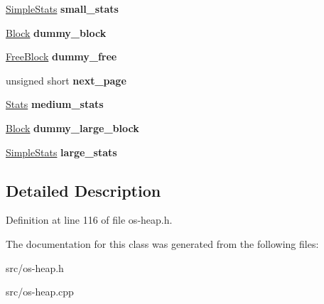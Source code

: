 \begin{DoxyCompactItemize}
\item 
\hyperlink{class_object_script_1_1_o_s_heap_manager_1_1_simple_stats}{Simple\+Stats} {\bfseries small\+\_\+stats}\hypertarget{class_object_script_1_1_o_s_heap_manager_aa19cb6cabaf7e63bc7eb643a29bc249e}{}\label{class_object_script_1_1_o_s_heap_manager_aa19cb6cabaf7e63bc7eb643a29bc249e}

\item 
\hyperlink{struct_object_script_1_1_o_s_heap_manager_1_1_block}{Block} {\bfseries dummy\+\_\+block}\hypertarget{class_object_script_1_1_o_s_heap_manager_a700aac3b5f7873b17e9ebff734cb378a}{}\label{class_object_script_1_1_o_s_heap_manager_a700aac3b5f7873b17e9ebff734cb378a}

\item 
\hyperlink{struct_object_script_1_1_o_s_heap_manager_1_1_free_block}{Free\+Block} {\bfseries dummy\+\_\+free}\hypertarget{class_object_script_1_1_o_s_heap_manager_a4fe7cf164b2a6abb4bf6d7792993449b}{}\label{class_object_script_1_1_o_s_heap_manager_a4fe7cf164b2a6abb4bf6d7792993449b}

\item 
unsigned short {\bfseries next\+\_\+page}\hypertarget{class_object_script_1_1_o_s_heap_manager_ada6b46a7e5ca7823fd1089972b62248a}{}\label{class_object_script_1_1_o_s_heap_manager_ada6b46a7e5ca7823fd1089972b62248a}

\item 
\hyperlink{struct_object_script_1_1_o_s_heap_manager_1_1_stats}{Stats} {\bfseries medium\+\_\+stats}\hypertarget{class_object_script_1_1_o_s_heap_manager_ae4441d14a18bb88a3f16cf758a64bf62}{}\label{class_object_script_1_1_o_s_heap_manager_ae4441d14a18bb88a3f16cf758a64bf62}

\item 
\hyperlink{struct_object_script_1_1_o_s_heap_manager_1_1_block}{Block} {\bfseries dummy\+\_\+large\+\_\+block}\hypertarget{class_object_script_1_1_o_s_heap_manager_ab75226704ba32eb7c725782965726aff}{}\label{class_object_script_1_1_o_s_heap_manager_ab75226704ba32eb7c725782965726aff}

\item 
\hyperlink{class_object_script_1_1_o_s_heap_manager_1_1_simple_stats}{Simple\+Stats} {\bfseries large\+\_\+stats}\hypertarget{class_object_script_1_1_o_s_heap_manager_a9e4cf95707d6c01f01e3428afcc58cb9}{}\label{class_object_script_1_1_o_s_heap_manager_a9e4cf95707d6c01f01e3428afcc58cb9}

\end{DoxyCompactItemize}


\subsection{Detailed Description}


Definition at line 116 of file os-\/heap.\+h.



The documentation for this class was generated from the following files\+:\begin{DoxyCompactItemize}
\item 
src/os-\/heap.\+h\item 
src/os-\/heap.\+cpp\end{DoxyCompactItemize}

